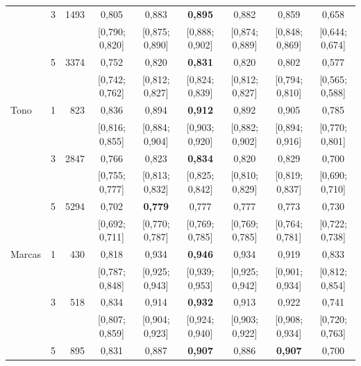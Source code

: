 \begin{table}[tbp]
\begin{tabular}{llrcccccc}
 & 3 & \num{1493} & 0{,}805 & 0{,}883 & \textbf{0{,}895} & 0{,}882 & 0{,}859 & 0{,}658 \\
& & & {\tiny [0{,}790; 0{,}820]} & {\tiny [0{,}875; 0{,}890]} & {\tiny [0{,}888; 0{,}902]} & {\tiny [0{,}874; 0{,}889]} & {\tiny [0{,}848; 0{,}869]} & {\tiny [0{,}644; 0{,}674]} \\[1pt]
 & 5 & \num{3374} & 0{,}752 & 0{,}820 & \textbf{0{,}831} & 0{,}820 & 0{,}802 & 0{,}577 \\
& & & {\tiny [0{,}742; 0{,}762]} & {\tiny [0{,}812; 0{,}827]} & {\tiny [0{,}824; 0{,}839]} & {\tiny [0{,}812; 0{,}827]} & {\tiny [0{,}794; 0{,}810]} & {\tiny [0{,}565; 0{,}588]} \\[1pt]
\addlinespace[2pt]
Tono & 1 & \num{823} & 0{,}836 & 0{,}894 & \textbf{0{,}912} & 0{,}892 & 0{,}905 & 0{,}785 \\
& & & {\tiny [0{,}816; 0{,}855]} & {\tiny [0{,}884; 0{,}904]} & {\tiny [0{,}903; 0{,}920]} & {\tiny [0{,}882; 0{,}902]} & {\tiny [0{,}894; 0{,}916]} & {\tiny [0{,}770; 0{,}801]} \\[1pt]
 & 3 & \num{2847} & 0{,}766 & 0{,}823 & \textbf{0{,}834} & 0{,}820 & 0{,}829 & 0{,}700 \\
& & & {\tiny [0{,}755; 0{,}777]} & {\tiny [0{,}813; 0{,}832]} & {\tiny [0{,}825; 0{,}842]} & {\tiny [0{,}810; 0{,}829]} & {\tiny [0{,}819; 0{,}837]} & {\tiny [0{,}690; 0{,}710]} \\[1pt]
 & 5 & \num{5294} & 0{,}702 & \textbf{0{,}779} & 0{,}777 & 0{,}777 & 0{,}773 & 0{,}730 \\
& & & {\tiny [0{,}692; 0{,}711]} & {\tiny [0{,}770; 0{,}787]} & {\tiny [0{,}769; 0{,}785]} & {\tiny [0{,}769; 0{,}785]} & {\tiny [0{,}764; 0{,}781]} & {\tiny [0{,}722; 0{,}738]} \\[1pt]
\addlinespace[2pt]
Marcas & 1 & \num{430} & 0{,}818 & 0{,}934 & \textbf{0{,}946} & 0{,}934 & 0{,}919 & 0{,}833 \\
& & & {\tiny [0{,}787; 0{,}848]} & {\tiny [0{,}925; 0{,}943]} & {\tiny [0{,}939; 0{,}953]} & {\tiny [0{,}925; 0{,}942]} & {\tiny [0{,}901; 0{,}934]} & {\tiny [0{,}812; 0{,}854]} \\[1pt]
 & 3 & \num{518} & 0{,}834 & 0{,}914 & \textbf{0{,}932} & 0{,}913 & 0{,}922 & 0{,}741 \\
& & & {\tiny [0{,}807; 0{,}859]} & {\tiny [0{,}904; 0{,}923]} & {\tiny [0{,}924; 0{,}940]} & {\tiny [0{,}903; 0{,}922]} & {\tiny [0{,}908; 0{,}934]} & {\tiny [0{,}720; 0{,}763]} \\[1pt]
 & 5 & \num{895} & 0{,}831 & 0{,}887 & \textbf{0{,}907} & 0{,}886 & \textbf{0{,}907} & 0{,}700 \\

\end{tabular}
\end{table}
